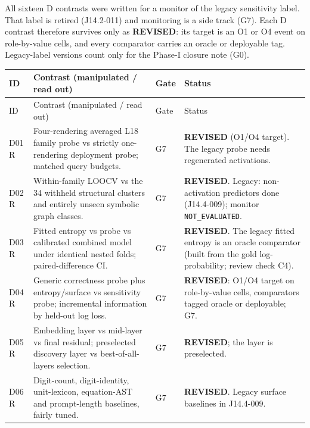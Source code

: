 \documentclass[10pt,a4paper]{article}
\newcommand{\NE}{\texttt{NOT\_EVALUATED}}
\begin{document}
All sixteen D contrasts were written for a monitor of the legacy sensitivity label. That label is retired
(J14.2-011) and monitoring is a side track (G7). Each D contrast therefore survives only as \textbf{REVISED}: its
target is an O1 or O4 event on role-by-value cells, and every comparator carries an oracle or deployable tag.
Legacy-label versions count only for the Phase-I closure note (G0).

\begingroup\small
\begin{longtable}{@{}P{1.2cm}P{7.2cm}P{1.3cm}P{5.6cm}@{}}
\toprule
ID & Contrast (manipulated / read out) & Gate & Status \\
\midrule
\endfirsthead
\toprule
ID & Contrast (manipulated / read out) & Gate & Status \\
\midrule
\endhead
\bottomrule
\endfoot
D01 \newline R & Four-rendering averaged L18 family probe vs strictly one-rendering deployment probe; matched query budgets. & G7 &
\textbf{REVISED} (O1/O4 target). The legacy probe needs regenerated activations. \\
D02 \newline R & Within-family LOOCV vs the 34 withheld structural clusters and entirely unseen symbolic graph classes. & G7 &
\textbf{REVISED}. Legacy: non-activation predictors done (J14.4-009); monitor \NE{}. \\
D03 \newline R & Fitted entropy vs probe vs calibrated combined model under identical nested folds; paired-difference CI. & G7 &
\textbf{REVISED}. The legacy fitted entropy is an oracle comparator (built from the gold log-probability; review check C4). \\
D04 \newline R & Generic correctness probe plus entropy/surface vs sensitivity probe; incremental information by held-out log loss. & G7 &
\textbf{REVISED}: O1/O4 target on role-by-value cells, comparators tagged oracle or deployable; G7. \\
D05 \newline R & Embedding layer vs mid-layer vs final residual; preselected discovery layer vs best-of-all-layers selection. & G7 &
\textbf{REVISED}; the layer is preselected. \\
D06 \newline R & Digit-count, digit-identity, unit-lexicon, equation-AST and prompt-length baselines, fairly tuned. & G7 &
\textbf{REVISED}. Legacy surface baselines in J14.4-009. \\

\end{longtable}
\end{document}
